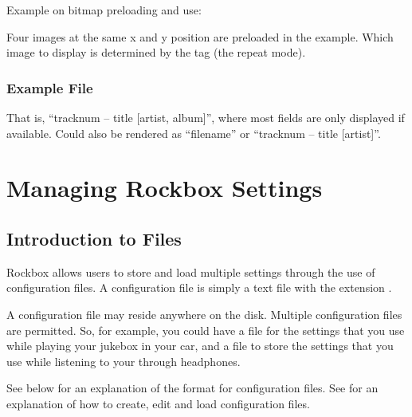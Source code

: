 Example on bitmap preloading and use:
\begin{example}
\end{example}
Four images at the same x and y position are preloaded in the example. Which
image to display is determined by the  tag (the repeat mode).

\subsubsection{Example File}
\begin{example}
\end{example}
That is, ``tracknum -- title [artist, album]'', where most fields are only
displayed if available. Could also be rendered as ``filename'' or ``tracknum --
title [artist]''.

%
%

\section{\label{ref:manage_settings}Managing Rockbox Settings}

\subsection{Introduction to  Files}
Rockbox allows users to store and load multiple settings through the use of
configuration files. A configuration file is simply a text file with the
extension .

A configuration file may reside anywhere on the disk. Multiple
configuration files are permitted. So, for example, you could have
a  file for the settings that you use while playing your
jukebox in your car, and a  file to store the
settings that you use while listening to your \dap{} through headphones.

See  below for an explanation of the format
for configuration files. See  for an
explanation of how to create, edit and load configuration files.

